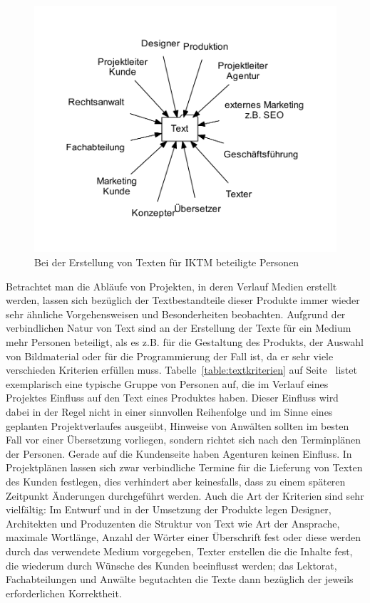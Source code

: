 \begin{figure}[htb]
\begin{center}
\includegraphics[width=\textwidth]{media/chart-2.pdf}
\end{center}
\caption{Bei der Erstellung von Texten für \ac{IKTM} beteiligte Personen}
\label{chart:2}
\end{figure}

Betrachtet man die Abläufe von Projekten, in deren Verlauf Medien erstellt werden, lassen sich bezüglich der Textbestandteile dieser Produkte immer wieder sehr ähnliche Vorgehensweisen und Besonderheiten beobachten. Aufgrund der verbindlichen Natur von Text sind an der Erstellung der Texte für ein Medium mehr Personen beteiligt, als es z.B. für die Gestaltung des Produkts, der Auswahl von Bildmaterial oder für die Programmierung der Fall ist,  da er sehr viele verschieden Kriterien erfüllen muss. Tabelle~\ref{table:textkriterien} auf Seite~\pageref{table:textkriterien} listet exemplarisch eine typische Gruppe von Personen auf, die im Verlauf eines Projektes Einfluss auf den Text eines Produktes haben. Dieser Einfluss wird dabei in der Regel nicht in einer sinnvollen Reihenfolge und im Sinne eines geplanten Projektverlaufes ausgeübt, Hinweise von Anwälten sollten im besten Fall vor einer Übersetzung vorliegen, sondern richtet sich nach den Terminplänen der Personen. Gerade auf die Kundenseite haben Agenturen keinen Einfluss. In Projektplänen lassen sich zwar verbindliche Termine für die Lieferung von Texten des Kunden festlegen, dies verhindert aber keinesfalls, dass zu einem späteren Zeitpunkt Änderungen durchgeführt werden. Auch die Art der Kriterien sind sehr vielfältig: Im Entwurf und in der Umsetzung der Produkte legen Designer, Architekten und Produzenten die Struktur von Text wie Art der Ansprache, maximale Wortlänge, Anzahl der Wörter einer Überschrift fest oder diese werden durch das verwendete Medium vorgegeben, Texter erstellen die die Inhalte fest, die wiederum durch Wünsche des Kunden beeinflusst werden; das Lektorat, Fachabteilungen und Anwälte begutachten die Texte dann bezüglich der jeweils erforderlichen Korrektheit.

